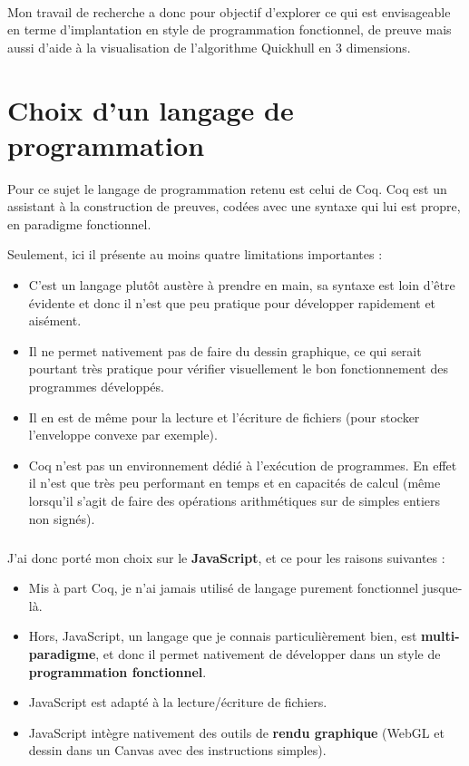 \documentclass[]{article}
\begin{document}
\paragraph{}
Mon travail de recherche a donc pour objectif d'explorer ce qui est envisageable en terme d'implantation en style de programmation fonctionnel, de preuve mais aussi d'aide à la visualisation de l'algorithme Quickhull en 3 dimensions.

\section{Choix d'un langage de programmation}
Pour ce sujet le langage de programmation retenu est celui de Coq. Coq est un assistant à la construction de preuves, codées avec une syntaxe qui lui est propre, en paradigme fonctionnel.

Seulement, ici il présente au moins quatre limitations importantes :
\begin{itemize}
	\item C'est un langage plutôt austère à prendre en main, sa syntaxe est loin d'être évidente et donc il n'est que peu pratique pour développer rapidement et aisément.
	\item Il ne permet nativement pas de faire du dessin graphique, ce qui serait pourtant très pratique pour vérifier visuellement le bon fonctionnement des programmes développés.
	\item Il en est de même pour la lecture et l'écriture de fichiers (pour stocker l'enveloppe convexe par exemple).
	\item Coq n'est pas un environnement dédié à l'exécution de programmes. En effet il n'est que très peu performant en temps et en capacités de calcul (même lorsqu'il s'agit de faire des opérations arithmétiques sur de simples entiers non signés).
\end{itemize}

\subparagraph{}
J'ai donc porté mon choix sur le \textbf{JavaScript}, et ce pour les raisons suivantes :
\begin{itemize}
	\item Mis à part Coq, je n'ai jamais utilisé de langage purement fonctionnel jusque-là.
	\item Hors, JavaScript, un langage que je connais particulièrement bien, est \textbf{multi-paradigme}, et donc il permet nativement de développer dans un style de \textbf{programmation fonctionnel}.
	\item JavaScript est adapté à la lecture/écriture de fichiers.
	\item JavaScript intègre nativement des outils de \textbf{rendu graphique} (WebGL et dessin dans un Canvas avec des instructions simples).
\end{itemize}
\end{document}
